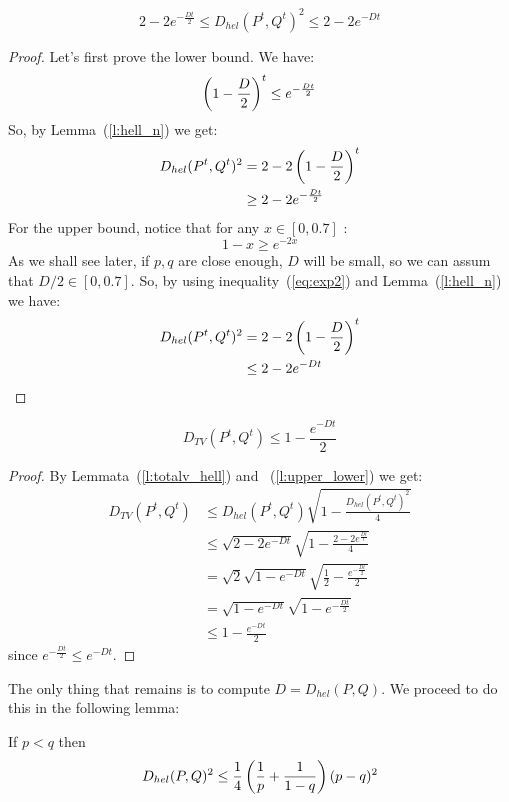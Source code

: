\begin{lemma}\label{l:upper_lower}
$$
2 - 2e^{-\frac{Dt}{2}} \leq D_{hel}(P^t,Q^t)^2 \leq
2 - 2e^{-Dt}
$$
\end{lemma}
\begin{proof}
Let's first prove the lower bound. We have:
\begin{equation}\label{eq:exp1}
\left(1 - \frac{D}{2}\right)^t \leq e^{-\frac{Dt}{2}}
\end{equation}
So, by Lemma~(\ref{l:hell_n}) we get:
\begin{align*}
D_{hel}(P^t,Q^t)^2 &= 2 - 2\left(1 - \frac{D}{2}\right)^t \\
&\geq 2 - 2e^{-\frac{Dt}{2}}
\end{align*}
For the upper bound, notice that for any $x\in[0,0.7]$ :
\begin{equation}\label{eq:exp2}
1 -x \geq e^{-2x}
\end{equation}
As we shall see later, if $p,q$ are close enough, $D$ will be small, so we can assum that $D/2 \in [0,0.7]$. So, by using inequality~(\ref{eq:exp2}) and Lemma~(\ref{l:hell_n})
we have:
\begin{align*}
D_{hel}(P^t,Q^t)^2 &= 2 - 2\left(1 - \frac{D}{2}\right)^t \\
&\leq 2 - 2 e^{-Dt}
\end{align*}
\end{proof}
\begin{lemma}\label{l:dtv_lower}
$$
D_{TV}(P^t,Q^t) \leq 1 - \frac{e^{-Dt}}{2}
$$
\end{lemma}
\begin{proof}
By Lemmata~(\ref{l:totalv_hell}) and ~(\ref{l:upper_lower}) we get:
\begin{align*}
D_{TV}(P^t,Q^t) &\leq D_{hel}(P^t,Q^t) \sqrt{1-\frac{D_{hel}(P^t,Q^t)^2}{4}}\\
&\leq \sqrt{2 - 2e^{-Dt}} \sqrt{1 - \frac{2 - 2e^{\frac{Dt}{t}}}{4}}\\
&= \sqrt{2}\sqrt{1 - e^{-Dt}} \sqrt{\frac{1}{2} - \frac{e^{-\frac{Dt}{2}}}{2}}\\
&= \sqrt{1 - e^{-Dt}} \sqrt{1 - e^{-\frac{Dt}{2}}}\\
&\leq 1 - \frac{e^{-Dt}}{2}
\end{align*}
since $e^{-\frac{Dt}{2}} \leq e^{-Dt}$. 
\end{proof}
The only thing that remains is to compute $D = D_{hel}(P,Q)$. We proceed to do this in the following lemma:
\begin{lemma}\label{l:hell}
If $p<q$ then
$$
D_{hel}(P,Q)^2 \leq \frac{1}{4}\left(\frac{1}{p} + \frac{1}{1-q}\right)(p-q)^2
$$
\end{lemma}
